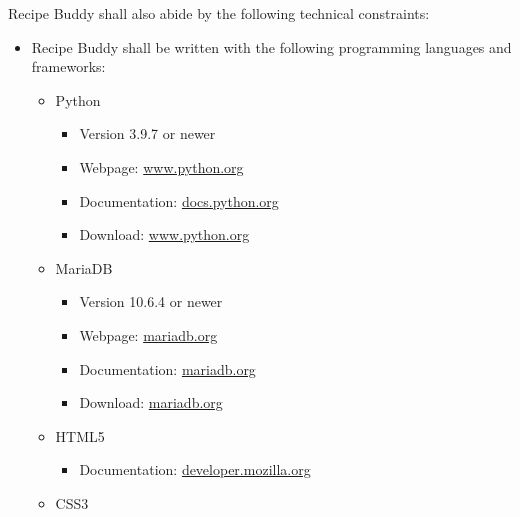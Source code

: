 \documentclass{scrreprt}
\begin{document}
\gls{Recipe Buddy} shall also abide by the following technical constraints:
\begin{itemize}
    \item \gls{Recipe Buddy} shall be written with the following programming languages and frameworks:
    \begin{itemize}

        \item \gls{Python}
        \begin{itemize}

            \item Version 3.9.7 or newer
            \item Webpage: \href{https://www.python.org/}{www.python.org}
            \item Documentation: \href{https://docs.python.org/3.9/}{docs.python.org}
            \item Download: \href{https://www.python.org/downloads/release/python-397/}{www.python.org}

        \end{itemize}

        \item \gls{MariaDB}
        \begin{itemize}

            \item Version 10.6.4 or newer
            \item Webpage: \href{https://mariadb.org/}{mariadb.org}
            \item Documentation: \href{https://mariadb.com/kb/en/}{mariadb.org}
            \item Download: \href{https://mariadb.org/download/?tab=mariadb&release=10.6.4&product=mariadb}{mariadb.org}
        
        \end{itemize}
        
        \item HTML5
        \begin{itemize}
        
            \item Documentation: \href{https://developer.mozilla.org/en-US/docs/Web/HTML}{developer.mozilla.org}
        
        \end{itemize}
        
        \item CSS3
        \begin{itemize}
        

\end{itemize}
\end{itemize}
\end{itemize}
\end{document}
